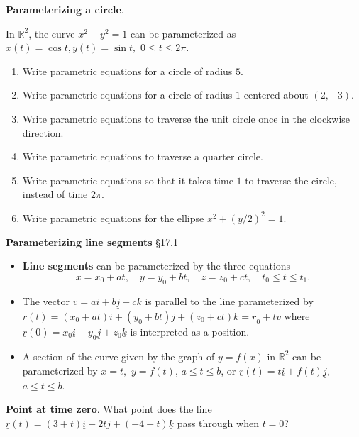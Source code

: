 \documentclass[12pt,letterpaper,noanswers]{exam}
\newcommand{\mb}[1]{\underline{#1}}
\begin{document}
\noindent\textbf{Parameterizing a circle}. 

In $\mathbb{R}^2$, the curve $x^2+y^2 = 1$ can be parameterized as $x(t) = \cos t, y(t) = \sin t,$ $0\leq t \leq 2\pi.$





\begin{enumerate}
\itemsep5em
\item Write parametric equations for a circle of radius $5$.
\item Write parametric equations for a circle of radius $1$ centered about $(2,-3)$.
\item Write parametric equations to traverse the unit circle once in the clockwise direction.
\item Write parametric equations to traverse a quarter circle.
\item Write parametric equations so that it takes time $1$ to traverse the circle, instead of time $2\pi$.
\item Write parametric equations for the ellipse $x^2+(y/2)^2 = 1$.
\end{enumerate}


\noindent\textbf{Parameterizing line segments} \S 17.1 
\begin{tcolorbox}
\begin{itemize}
\itemsep0em
    \item \textbf{Line segments} can be parameterized by the three equations \[x = x_0 + a t, \quad y = y_0 + b t, \quad z = z_0 + c t, \quad t_0 \leq t \leq t_1. \]
    \item The vector $\mb v = a\mb i +b\mb j + c\mb k$ is parallel to the line parameterized by $\mb r(t) = (x_0+at)\mb i + (y_0 + bt)\mb j + (z_0 + ct)\mb k = \mb r_0 + t\mb v$ where $\mb r(0) = x_0\mb i + y_0\mb j + z_0\mb k$ is interpreted as a position.
    \item A section of the curve given by the graph of $y = f(x)$ in $\mathbb{R}^2$ can be parameterized by $x = t,$ $y = f(t)$, $a\leq t\leq b$, or $\mb r(t) = t\mb i + f(t)\mb j$, $a\leq t\leq b$.
\end{itemize}
\end{tcolorbox}



\noindent\textbf{Point at time zero}.  What point does the line $\mb r(t)=(3+t)\mb i + 2t\mb j+ (-4-t)\mb k$ pass through when $t=0$?
\end{document}
